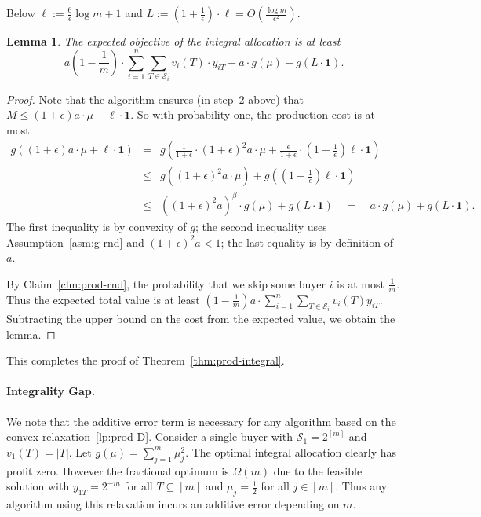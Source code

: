 \documentclass[letterpaper,11pt]{article}
\newtheorem{lemma}[thm]{Lemma}
\def\cS{\mathcal{S}}
\def\sse{\subseteq}
\begin{document}
Below $\ell:=\frac6\epsilon \log m +1$ and $L:=(1+\frac1\epsilon)\cdot \ell=O(\frac{\log m}{\epsilon^2})$.


\begin{lemma}\label{lem:prod-rnd} The expected objective of the integral allocation is
at least
$$a(1-\frac1m)\cdot \sum_{i=1}^{n} \sum_{T\in \cS_i} v_i(T)\cdot y_{iT} - a \cdot g(\mu) - g(L\cdot \mathbf{1}).$$
\end{lemma}
\begin{proof} Note that the algorithm ensures (in step~2 above) that $M\le (1+\epsilon)a\cdot \mu + \ell\cdot \mathbf{1}$. So with probability one, the production cost  is at most:
\begin{eqnarray*}
g((1+\epsilon)a\cdot \mu + \ell\cdot \mathbf{1}) & = & g\left(\frac{1}{1+\epsilon}\cdot (1+\epsilon)^2a\cdot \mu + \frac{\epsilon}{1+\epsilon}\cdot (1+\frac1\epsilon) \ell\cdot \mathbf{1}\right)\\
&\le &  g\left((1+\epsilon)^2a\cdot \mu\right) +  g\left( (1+\frac1\epsilon) \ell\cdot \mathbf{1}\right)\\
&\le & ((1+\epsilon)^2a)^\beta\cdot g(\mu) + g\left( L\cdot \mathbf{1}\right)\quad = \quad a \cdot g(\mu) + g\left( L\cdot \mathbf{1}\right).
\end{eqnarray*}
The first inequality is by convexity of $g$; the second inequality uses Assumption~\ref{asm:g-rnd} and $(1+\epsilon)^2a<1$; the last equality is by definition of $a$.

By Claim~\ref{clm:prod-rnd}, the probability that we skip some buyer $i$ is at most $\frac{1}{m}$. Thus the expected total value is at least $(1-\frac{1}{m})a \cdot \sum_{i=1}^{n} \sum_{T\in \cS_i} v_i(T) y_{iT}$. Subtracting the upper bound on the cost from the expected value, we obtain the lemma. \end{proof}

This completes the proof of Theorem~\ref{thm:prod-integral}.


\paragraph{Integrality Gap.} We note that the additive error term is necessary for any algorithm based on the convex relaxation~\eqref{lp:prod-D}. Consider a single buyer with $\cS_1=2^{[m]}$ and $v_1(T)=|T|$. Let $g(\mu) = \sum_{j=1}^m \mu_j^2$. The optimal integral allocation clearly has profit zero. However the fractional optimum is $\Omega(m)$ due to the feasible solution with $y_{1T}=2^{-m}$ for all $T\sse [m]$ and $\mu_j=\frac12$ for all $j\in[m]$. Thus any algorithm using this relaxation incurs an additive error depending on $m$.
\end{document}
